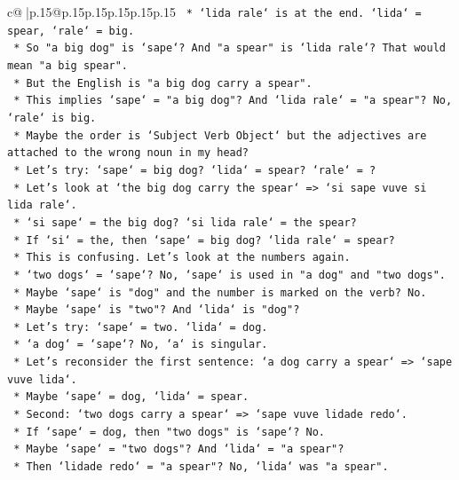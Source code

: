 \documentclass{article}
\begin{document}
{\begin{supertabular}{c@{$\;$}|p{.15\linewidth}@{}p{.15\linewidth}p{.15\linewidth}p{.15\linewidth}p{.15\linewidth}p{.15\linewidth}}
{{{\texttt{        *   `lida rale` is at the end. `lida` = spear, `rale` = big.} \\
\texttt{        *   So "a big dog" is `sape`? And "a spear" is `lida rale`? That would mean "a big spear".} \\
\texttt{        *   But the English is "a big dog carry a spear".} \\
\texttt{        *   This implies `sape` = "a big dog"? And `lida rale` = "a spear"? No, `rale` is big.} \\
\texttt{        *   Maybe the order is `Subject Verb Object` but the adjectives are attached to the wrong noun in my head?} \\
\texttt{        *   Let's try: `sape` = big dog? `lida` = spear? `rale` = ?} \\
\texttt{        *   Let's look at `the big dog carry the spear` => `si sape vuve si lida rale`.} \\
\texttt{        *   `si sape` = the big dog? `si lida rale` = the spear?} \\
\texttt{        *   If `si` = the, then `sape` = big dog? `lida rale` = spear?} \\
\texttt{        *   This is confusing. Let's look at the numbers again.} \\
\texttt{        *   `two dogs` = `sape`? No, `sape` is used in "a dog" and "two dogs".} \\
\texttt{        *   Maybe `sape` is "dog" and the number is marked on the verb? No.} \\
\texttt{        *   Maybe `sape` is "two"? And `lida` is "dog"?} \\
\texttt{        *   Let's try: `sape` = two. `lida` = dog.} \\
\texttt{        *   `a dog` = `sape`? No, `a` is singular.} \\
\texttt{        *   Let's reconsider the first sentence: `a dog carry a spear` => `sape vuve lida`.} \\
\texttt{        *   Maybe `sape` = dog, `lida` = spear.} \\
\texttt{        *   Second: `two dogs carry a spear` => `sape vuve lidade redo`.} \\
\texttt{        *   If `sape` = dog, then "two dogs" is `sape`? No.} \\
\texttt{        *   Maybe `sape` = "two dogs"? And `lida` = "a spear"?} \\
\texttt{        *   Then `lidade redo` = "a spear"? No, `lida` was "a spear".} \\
}}}
\end{supertabular}}
\end{document}
